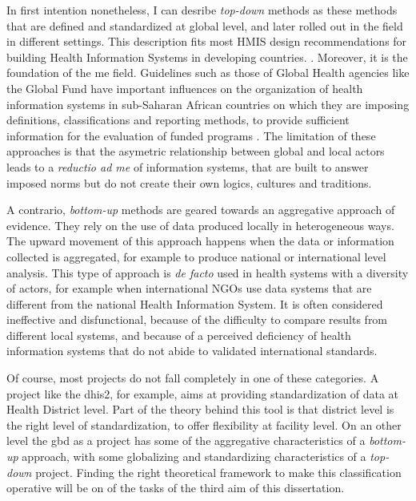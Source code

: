 In first intention nonetheless, I can desribe \textit{top-down} methods as these methods that are defined and standardized at global level, and later rolled out in the field in different settings. This description fits most HMIS design recommendations for building Health Information Systems in developing countries. \citep{lippeveld_routine_2000,rhino_introducing_2003,daltilia_systeme_2005,health_metrics_network_framework_2008}. Moreover, it is the foundation of the \gls{me} field. Guidelines such as those of Global Health agencies like the Global Fund have important influences on the organization of health information systems in sub-Saharan African countries on which they are imposing definitions, classifications and reporting methods, to provide sufficient information for the evaluation of funded programs \citep{the_global_fund_global_2014}. The limitation of these approaches is that the asymetric relationship between global and local actors leads to a \textit{reductio ad \gls{me}} of information systems, that are built to answer imposed norms but do not create their own logics, cultures and traditions.


A contrario, \textit{bottom-up} methods are geared towards an aggregative approach of evidence. They rely on the use of data produced locally in heterogeneous ways. The upward movement of this approach happens when the data or information collected is aggregated, for example to produce national or international level analysis. This type of approach is \textit{de facto} used in health systems with a diversity of actors, for example when international NGOs use data systems that are different from the national Health Information System. It is often considered ineffective and disfunctional, because of the difficulty to compare results from different local systems, and because of a perceived deficiency of health information systems that do not abide to validated international standards.

Of course, most projects do not fall completely in one of these categories. A project like the \gls{dhis2}, for example, aims at providing standardization of data at Health District level. Part of the theory behind this tool is that district level is the right level of standardization, to offer flexibility at facility level. On an other level the \gls{gbd} as a project has some of the aggregative characteristics of a \textit{bottom-up} approach, with some globalizing and standardizing characteristics of a \textit{top-down} project. Finding the right theoretical framework to make this classification operative will be on of the tasks of the third aim of this dissertation.



